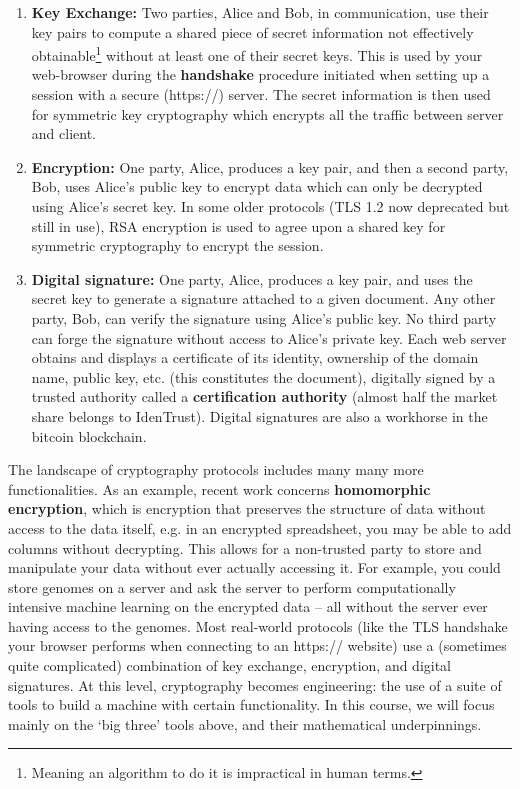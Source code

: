 \documentclass{article}
\theoremstyle{plain}
\theoremstyle{definition}
\theoremstyle{remark}
\numberwithin{theorem}{section}
\begin{document}
\begin{enumerate}
  \item \textbf{Key Exchange:}  Two parties, Alice and Bob, in communication, use their key pairs to compute a shared piece of secret information not effectively obtainable\footnote{Meaning an algorithm to do it is impractical in human terms.} without at least one of their secret keys.  This is used by your web-browser during the \textbf{handshake} procedure initiated when setting up a session with a secure (https://) server.  The secret information is then used for symmetric key cryptography which encrypts all the traffic between server and client.
	\item \textbf{Encryption:}  One party, Alice, produces a key pair, and then a second party, Bob, uses Alice's public key to encrypt data which can only be decrypted using Alice's secret key.  In some older protocols (TLS 1.2 now deprecated but still in use), RSA encryption is used to agree upon a shared key for symmetric cryptography to encrypt the session.
	\item \textbf{Digital signature:}  One party, Alice, produces a key pair, and uses the secret key to generate a signature attached to a given document.  Any other party, Bob, can verify the signature using Alice's public key.  No third party can forge the signature without access to Alice's private key.  Each web server obtains and displays a certificate of its identity, ownership of the domain name, public key, etc. (this constitutes the document), digitally signed by a trusted authority called a \textbf{certification authority} (almost half the market share belongs to IdenTrust).  Digital signatures are also a workhorse in the bitcoin blockchain.
\end{enumerate}

The landscape of cryptography protocols includes many many more functionalities.  As an example, recent work concerns \textbf{homomorphic encryption}, which is encryption that preserves the structure of data without access to the data itself, e.g. in an encrypted spreadsheet, you may be able to add columns without decrypting.  This allows for a non-trusted party to store and manipulate your data without ever actually accessing it.  For example, you could store genomes on a server and ask the server to perform computationally intensive machine learning on the encrypted data -- all without the server ever having access to the genomes.  Most real-world protocols (like the TLS handshake your browser performs when connecting to an https:// website) use a (sometimes quite complicated) combination of key exchange, encryption, and digital signatures.  At this level, cryptography becomes engineering:  the use of a suite of tools to build a machine with certain functionality.  In this course, we will focus mainly on the `big three' tools above, and their mathematical underpinnings.
\end{document}
